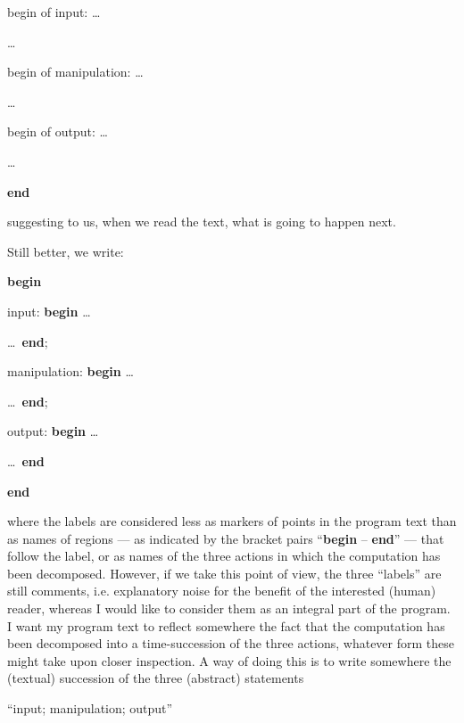 \noindent
begin of input:\tabto{10em} \quad\dots
\nopagebreak

\noindent
\tabto{10em} \quad\dots

\noindent
begin of manipulation:\tabto{10em} \quad\dots
\nopagebreak

\noindent
\tabto{10em} \quad\dots

\noindent
begin of output:\tabto{10em} \quad\dots
\nopagebreak

\noindent
\tabto{10em} \quad\dots

\noindent
\tabto{10em}\textbf{end}

\noindent
suggesting to us, when we read the text, what is going to happen next.

Still better, we write:

\noindent
\tabto{10em}\textbf{begin}
\nopagebreak

\noindent
input:\tabto{10em} \quad\textbf{begin} \tabto{14em}\dots
\nopagebreak

\noindent
\tabto{13em} \quad\dots\ \textbf{end};

\noindent
manipulation:\tabto{10em} \quad\textbf{begin} \tabto{14em}\dots
\nopagebreak

\noindent
\tabto{13em} \quad\dots\ \textbf{end};

\noindent
output:\tabto{10em} \quad\textbf{begin} \tabto{14em}\dots
\nopagebreak
\nopagebreak

\noindent
\tabto{13em} \quad\dots\ \textbf{end}
\nopagebreak

\noindent
\tabto{10em}\textbf{end}

\noindent
where the labels are considered less as markers of points in the program text than as names of regions --- as indicated by the bracket pairs ``\textbf{begin} -- \textbf{end}'' --- that follow the label, or as names of the three actions in which the computation has been decomposed. However, if we take this point of view, the three ``labels'' are still comments, i.e. explanatory noise for the benefit of the interested (human) reader, whereas I would like to consider them as an integral part of the program. I want my program text to reflect somewhere the fact that the computation has been decomposed into a time-succession of the three actions, whatever form these might take upon closer inspection. A way of doing this is to write somewhere the (textual) succession of the three (abstract) statements
\medskip

{
	\setlength{\parindent}{8em}
	\hspace{-.4em}``input; manipulation; output''
}
\medskip

